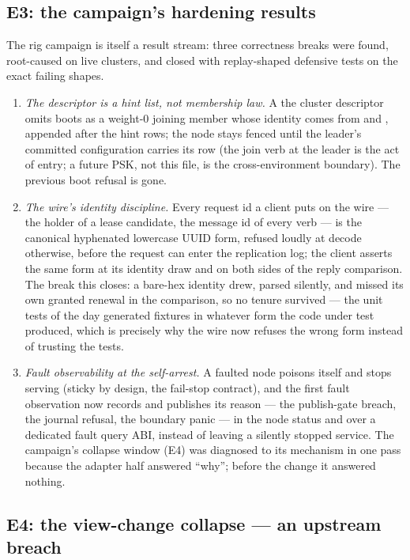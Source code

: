\subsection{E3: the campaign's hardening results}

The rig campaign is itself a result stream: three correctness breaks
were found, root-caused on live clusters, and closed with
replay-shaped defensive tests on the exact failing shapes.

\begin{enumerate}
\item \emph{The descriptor is a hint list, not membership law.} A
 the cluster descriptor omits boots as a weight-0 joining
member whose identity comes from  and
, appended after the hint rows; the node stays
fenced until the leader's committed configuration carries its row (the
join verb at the leader is the act of entry; a future PSK, not this
file, is the cross-environment boundary). The previous
 boot refusal is gone.
\item \emph{The wire's identity discipline.} Every request id a client
puts on the wire --- the holder of a lease candidate, the message id of
every verb --- is the canonical hyphenated lowercase UUID form,
refused loudly at decode otherwise, before the request can enter the
replication log; the client asserts the same form at its identity draw
and on both sides of the reply comparison. The break this closes: a
bare-hex identity drew, parsed silently, and missed its own granted
renewal in the comparison, so no tenure survived --- the unit tests of
the day generated fixtures in whatever form the code under test
produced, which is precisely why the wire now refuses the wrong form
instead of trusting the tests.
\item \emph{Fault observability at the self-arrest.} A faulted node
poisons itself and stops serving (sticky by design, the fail-stop
contract), and the first fault observation now records and publishes
its reason --- the publish-gate breach, the journal refusal, the
boundary panic --- in the node status and over a dedicated fault
query ABI, instead of leaving a silently stopped service. The
campaign's collapse window (E4) was diagnosed to its mechanism in one
pass because the adapter half answered ``why''; before the change it
answered nothing.
\end{enumerate}

\subsection{E4: the view-change collapse --- an upstream breach}

